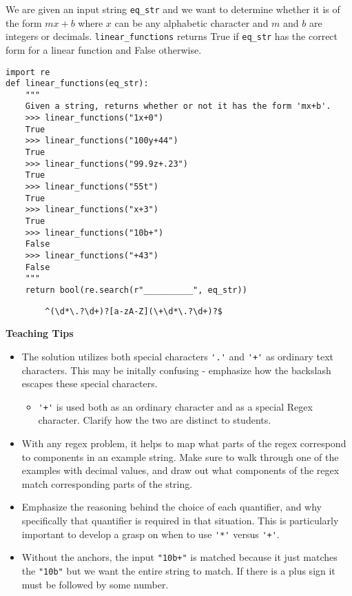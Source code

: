 \begin{blocksection}
\question We are given an input string \lstinline{eq_str} and we want to determine whether it is of the form 
$mx+b$ where $x$ can be any alphabetic character and $m$ and $b$ are integers or decimals. \lstinline{linear_functions} returns True if \lstinline{eq_str} 
has the correct form for a linear function and False otherwise.

\begin{lstlisting}
import re
def linear_functions(eq_str):
    """
    Given a string, returns whether or not it has the form 'mx+b'.
    >>> linear_functions("1x+0")
    True
    >>> linear_functions("100y+44")
    True
    >>> linear_functions("99.9z+.23")
    True
    >>> linear_functions("55t")
    True
    >>> linear_functions("x+3")
    True
    >>> linear_functions("10b+")
    False
    >>> linear_functions("+43")
    False
    """
    return bool(re.search(r"__________", eq_str))
\end{lstlisting}

\begin{solution}[2in]
    \begin{lstlisting}
        ^(\d*\.?\d+)?[a-zA-Z](\+\d*\.?\d+)?$
    \end{lstlisting}
\end{solution}
\end{blocksection}

\begin{guide}
\begin{blocksection}
\textbf{Teaching Tips}
    \begin{itemize}
        \item The solution utilizes both special characters \lstinline$'.'$ and \lstinline$'+'$ as ordinary text characters. This may be initally confusing - emphasize how the backslash escapes these special characters.
        \begin{itemize}
            \item \lstinline$'+'$ is used both as an ordinary character and as a special Regex character. Clarify how the two are distinct to students.
        \end{itemize}
        \item With any regex problem, it helps to map what parts of the regex correspond to components in an example string. Make sure to walk through one of the examples with decimal values, and draw out what components of the regex match corresponding parts of the string.
        \item Emphasize the reasoning behind the choice of each quantifier, and why specifically that quantifier is required in that situation. This is particularly important to develop a grasp on when to use \lstinline$'*'$ versus \lstinline$'+'$.
        \item Without the anchors, the input \lstinline{"10b+"} is matched because it just matches the \lstinline{"10b"} but we want the entire string to match. If there is a plus sign it must be followed by some number.
    \end{itemize}
\end{blocksection}
\end{guide}
    